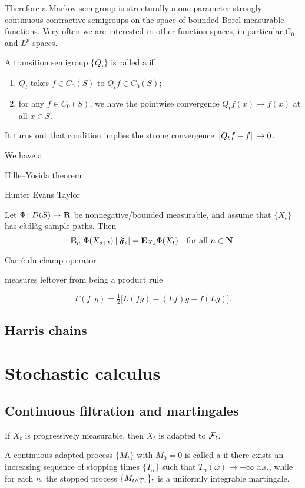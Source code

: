 \documentclass[10pt]{book}
\begin{document}
Therefore a Markov semigroup is structurally a one-parameter strongly continuous contractive semigroups on the space of bounded Borel measurable functions. Very often we are interested in other function spaces, in particular $C_0$ and $L^p$ spaces.

A transition semigroup $\{Q_t\}$ is called a  if \begin{enumerate}
    \item $Q_t$ takes $f \in C_0(S)$ to $Q_tf\in C_0(S)$;
    \item for any $f \in C_0(S)$, we have the pointwise convergence $Q_tf(x)\to f(x)$ at all $x\in S$.
\end{enumerate}

It turns out that condition implies the strong convergence $\lVert Q_tf - f \rVert \to 0$.

We have a 

Hille--Yosida theorem

Hunter Evans Taylor

\begin{namedthm}
    Let $\Phi \colon D(S) \to \mathbf{R}$ be nonnegative/bounded measurable, and assume that $\{X_t\}$ has càdlàg sample paths. Then 
    \[
        \mathop{}\!\mathbf{E}_\mu[\Phi(X_{s+t}) \mathbin{|} \mathfrak F_s]= \mathop{}\!\mathbf{E}_{X_s}\Phi(X_t) \quad\text{for all }n\in \mathbf{N}.
    \]
\end{namedthm}

Carré du champ operator 


measures leftover from being a product rule

\[\Gamma(f,g) = \tfrac{1}{2} \bigl[L(fg) - (Lf) g - f (Lg)\bigr]. \]

\section{Harris chains}




\chapter{Stochastic calculus}
\section{Continuous filtration and martingales}

If $X_t$ is progressively measurable, then $X_t$ is adapted to $\mathcal{F}_t$.

A continuous adapted process $\{M_t\}$ with $M_0 = 0$ is called a  if there exists an increasing sequence of stopping times $\{T_n\}$ such that $T_n(\omega) \to +\infty$ a.s., while for each $n$, the stopped process $\{M_{t \land T_n}\}_t$ is a uniformly integrable martingale.
\end{document}
